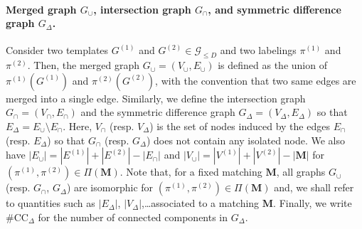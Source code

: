 \documentclass[final]{colt2026}
\newcommand{\1}{\mathbf{1}}
\begin{document}
\paragraph{Merged graph $G_\cup$, intersection graph $G_{\cap}$, and symmetric difference graph $G_{\Delta}$.} Consider two templates $G^{(1)}$ and $G^{(2)} \in \mathcal G_{\leq D}$ and two labelings $\pi^{(1)}$ and $\pi^{(2)}$. Then, the merged graph $G_{\cup}=(V_{\cup},E_{\cup})$ is defined as the union of $\pi^{(1)}(G^{(1)})$ and $\pi^{(2)}(G^{(2)})$, with the convention that two same edges are merged into a single edge. Similarly,  we define the intersection graph 
$G_{\cap}=(V_{\cap},E_{\cap})$ and the symmetric difference graph $G_{\Delta}=(V_{\Delta},E_{\Delta})$ so that $E_{\Delta}=E_{\cup}\setminus E_{\cap}$. Here, $V_{\cap}$ (resp. $V_{\Delta}$) is the set of nodes induced by the edges $E_{\cap}$ (resp. $E_{\Delta}$)
so that $G_{\cap}$ (resp. $G_{\Delta}$) does not contain any isolated node.  We also have $|E_{\cup}| = | E^{(1)}| +|E^{(2)}| - |E_\cap|$ and $|V_{\cup}| = |V^{(1)}|+|V^{(2)}|-|\mathbf{M}|$ for $(\pi^{(1)},\pi^{(2)})\in \Pi(\mathbf M)$. Note that, for a fixed matching $\mathbf{M}$, all graphs $G_{\cup}$ (resp. $G_{\cap}$, $G_\Delta$) are isomorphic for $(\pi^{(1)},\pi^{(2)})\in \Pi(\mathbf M)$ and, we shall refer to quantities such as $|E_{\Delta}|$, $|V_{\Delta}|$,\ldots associated to a matching $\mathbf{M}$.  
Finally, we write $\#\mathrm{CC}_{\Delta}$ for the number of connected components in $G_{\Delta}$. 
\end{document}
